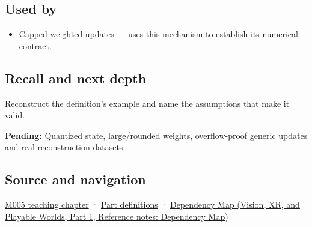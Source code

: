 \subsection{Used by}\label{appendix-260182e617b7-used-by}

\hypertarget{appendix-260182e617b7-used-by}{}

\begin{itemize}
\tightlist
\item
  \hyperref[appendix-1e45d0613db3]{Capped weighted updates} --- uses this mechanism to establish its numerical contract.
\end{itemize}

\subsection{Recall and next depth}\label{appendix-260182e617b7-recall-and-next-depth}

\hypertarget{appendix-260182e617b7-recall-and-next-depth}{}

Reconstruct the definition's example and name the assumptions that make it valid.

\textbf{Pending:} Quantized state, large/rounded weights, overflow-proof generic updates and real reconstruction datasets.

\subsection{Source and navigation}\label{appendix-260182e617b7-source-and-navigation}

\hypertarget{appendix-260182e617b7-source-and-navigation}{}

\hyperref[01-foundations-i-ch001-when-arithmetic-meets-uncertainty]{M005 teaching chapter} · \hyperref[appendix-fd090d982a15-m005---parts-77-88]{Part definitions} · \href{../07-Vision-XR-and-Playable-Worlds-P01/main.pdf\#appendix-4ad47bdd269a}{Dependency Map (Vision, XR, and Playable Worlds, Part 1, Reference notes: Dependency Map)}
